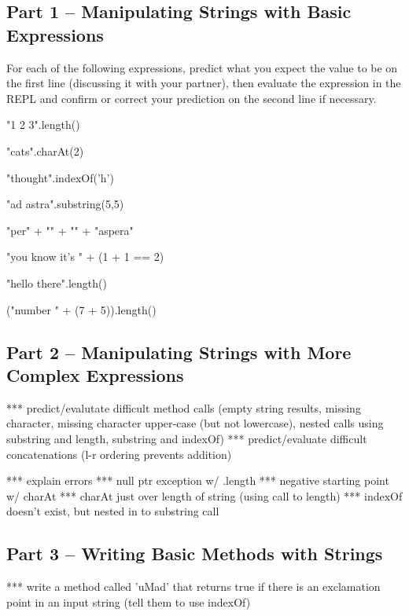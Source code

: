 \subsection{Part 1 -- Manipulating Strings with Basic Expressions}

\begin{eval}
For each of the following expressions, predict what you expect the value to be on the first line (discussing it with your partner), then evaluate the expression in the REPL and confirm or correct your prediction on the second line if necessary. 
\begin{sevalenum}
\item "1 2 3".length()
\evallinetwo
\item "cats".charAt(2)
\evallinetwo
\item "thought".indexOf('h')
\evallinetwo
\item "ad astra".substring(5,5)
\evallinetwo
\item "per" + "" + "" + "aspera"
\evallinetwo
\item "you know it's " + (1 + 1 == 2)
\evallinetwo
\item "hello   there".length()
\evallinetwo
\item ("number " + (7 + 5)).length()
\evallinetwo
\end{sevalenum}
\end{eval}


\subsection{Part 2 -- Manipulating Strings with More Complex Expressions}
*** predict/evalutate difficult method calls (empty string results, missing character, missing character upper-case (but not lowercase), nested calls using substring and length, substring and indexOf)
*** predict/evaluate difficult concatenations (l-r ordering prevents addition)

*** explain errors
	*** null ptr exception w/ .length
	*** negative starting point w/ charAt
	*** charAt just over length of string (using call to length)
	*** indexOf doesn't exist, but nested in to substring call


\initialbox

\subsection{Part 3 -- Writing Basic Methods with Strings}

*** write a method called 'uMad' that returns true if there is an exclamation point in an input string (tell them to use indexOf)


